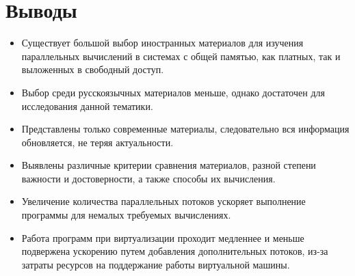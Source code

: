 \documentclass{article}
\begin{document}
\section{Выводы}
	\begin{itemize}
		\item Существует большой выбор иностранных материалов для изучения параллельных вычислений в системах с общей памятью, как платных, так и выложенных в свободный доступ.
		\item Выбор среди русскоязычных материалов меньше, однако достаточен для исследования данной тематики.
		\item Представлены только современные материалы, следовательно вся информация обновляется, не теряя актуальности.
		\item Выявлены различные критерии сравнения материалов, разной степени важности и достоверности, а также способы их вычисления. 
		\item Увеличение количества параллельных потоков ускоряет выполнение программы для немалых требуемых вычислениях.
		\item Работа программ при виртуализации проходит медленнее и меньше подвержена ускорению путем добавления дополнительных потоков, из-за затраты ресурсов на поддержание работы виртуальной машины.
	\end{itemize}

\newpage
\end{document}
